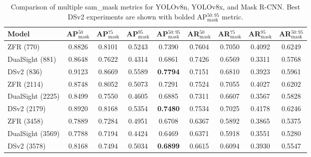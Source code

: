 
\begin{table}[h!]
\centering
\begin{tabular}{l|cccc|cccc}
\toprule
\textbf{Model} & \textbf{AP$^{50}_{\text{mask}}$} & \textbf{AP$^{75}_{\text{mask}}$} & \textbf{AP$^{95}_{\text{mask}}$} & \textbf{AP$^{50:95}_{\text{mask}}$} & \textbf{AR$^{50}_{\text{mask}}$} & \textbf{AR$^{75}_{\text{mask}}$} & \textbf{AR$^{95}_{\text{mask}}$} & \textbf{AR$^{50:95}_{\text{mask}}$} \\ \midrule
ZFR (770) & 0.8826 & 0.8101 & 0.5243 & 0.7390 & 0.7604 & 0.7050 & 0.4092 & 0.6249 \\ 
DualSight (881) & 0.8648 & 0.7622 & 0.4314 & 0.6861 & 0.7426 & 0.6569 & 0.3311 & 0.5768 \\ 
DSv2 (836) & 0.9123 & 0.8669 & 0.5589 & \textbf{0.7794} & 0.7151 & 0.6810 & 0.3923 & 0.5961 \\ 
ZFR (2114) & 0.8748 & 0.8052 & 0.5073 & 0.7291 & 0.7524 & 0.7055 & 0.4027 & 0.6202 \\ 
DualSight (2225) & 0.8499 & 0.7550 & 0.4605 & 0.6885 & 0.7311 & 0.6607 & 0.3567 & 0.5828 \\ 
DSv2 (2179) & 0.8920 & 0.8168 & 0.5354 & \textbf{0.7480} & 0.7534 & 0.7025 & 0.4178 & 0.6246 \\ 
ZFR (3458) & 0.7889 & 0.7284 & 0.4951 & 0.6708 & 0.6367 & 0.5892 & 0.3865 & 0.5375 \\ 
DualSight (3569) & 0.7788 & 0.7194 & 0.4424 & 0.6469 & 0.6371 & 0.5918 & 0.3551 & 0.5280 \\ 
DSv2 (3578) & 0.8168 & 0.7494 & 0.5034 & \textbf{0.6899} & 0.6615 & 0.6094 & 0.3930 & 0.5547 \\ 

\bottomrule
\end{tabular}
\caption{Comparison of multiple sam\_mask metrics for YOLOv8n, YOLOv8x, and Mask R-CNN. 
Best DSv2 experiments are shown with bolded AP$^{50:95}_{\text{mask}}$ metric.}
\label{tab:full_comparison}
\end{table}
